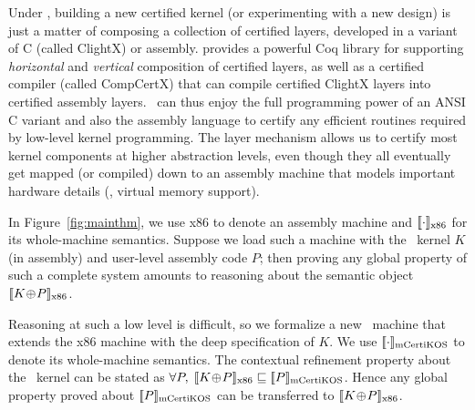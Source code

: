 Under \CTOS, building a new certified kernel (or experimenting with a new
design) is just a matter of composing a collection of certified
layers, developed in a variant of C (called ClightX) or assembly.
\CTOS{} provides  a powerful Coq library
for supporting {\em horizontal} and {\em vertical} composition of
certified layers, as well as a certified compiler (called
CompCertX) that can compile certified ClightX layers into certified
assembly layers. \CTOS\ can thus enjoy the full programming power of
an ANSI C variant and also the assembly language to certify any
efficient routines required by low-level kernel programming.  The
layer mechanism allows us to certify most kernel components at higher
abstraction levels, even though they all eventually get mapped (or
compiled) down to an assembly machine
 that models important hardware details (\eg, virtual memory support).


In Figure~\ref{fig:mainthm}\ronghui{$\oplus$}, we use x86 to denote an assembly machine
and {$\sem{\rm{}x86}{\cdot}$} for its whole-machine semantics.
Suppose we load such a machine with the \mCTOS\ kernel $K$ (in
assembly) and user-level assembly code $P$; then proving any
global property of such a complete system amounts to reasoning about
the semantic object {$\sem{\rm{}x86}{K\join P}$}.

Reasoning at such a low level is difficult, so we formalize a new
\mCTOS\ machine that extends the x86 machine with the deep
specification of $K$. We use $\sem{\rm\mCTOS}{\cdot}$ to denote its
whole-machine semantics.  The contextual refinement property about the
\mCTOS\ kernel can be stated as $\forall
P,\;\sem{\rm{}x86}{K\join{}P}\Refrel{}\sem{\rm\mCTOS}{P}$.
\noindent{}Hence any global property proved about
$\sem{\rm\mCTOS}{P}$ can be transferred to
$\sem{\rm{}x86}{K\join{}P}$.



